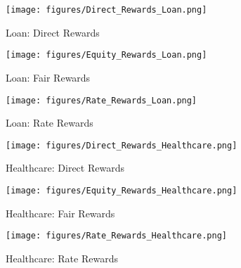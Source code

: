 \begin{figure*}[ht!] 
   \centering
  \begin{subfigure}{0.28\textwidth}
    \texttt{[image: figures/Direct\_Rewards\_Loan.png]}
    \caption{Loan: Direct Rewards} \label{fig:Direct_Rewards_Loan}
  \end{subfigure}%
  \hspace{0.05\textwidth}
  \begin{subfigure}{0.28\textwidth}
    \texttt{[image: figures/Equity\_Rewards\_Loan.png]}
    \caption{Loan: Fair Rewards} \label{fig:Equity_Rewards_Loan}
  \end{subfigure}%
  \hspace{0.05\textwidth}
  \begin{subfigure}{0.28\textwidth}
    \texttt{[image: figures/Rate\_Rewards\_Loan.png]}
    \caption{Loan: Rate Rewards} \label{fig:Rate_Rewards_Loan}
  \end{subfigure}%

  \begin{subfigure}{0.28\textwidth}
    \texttt{[image: figures/Direct\_Rewards\_Healthcare.png]}
    \caption{Healthcare: Direct Rewards} \label{fig:Direct_Rewards_Healthcare}
  \end{subfigure}%
  \hspace{0.05\textwidth}
  \begin{subfigure}{0.28\textwidth}
    \texttt{[image: figures/Equity\_Rewards\_Healthcare.png]}
    \caption{Healthcare: Fair Rewards} \label{fig:Equity_Rewards_Healthcare}
  \end{subfigure}%
  \hspace{0.05\textwidth}
  \begin{subfigure}{0.28\textwidth}
    \texttt{[image: figures/Rate\_Rewards\_Healthcare.png]}
    \caption{Healthcare: Rate Rewards} \label{fig:Rate_Rewards_Healthcare}
  \end{subfigure}%


\end{figure*}
